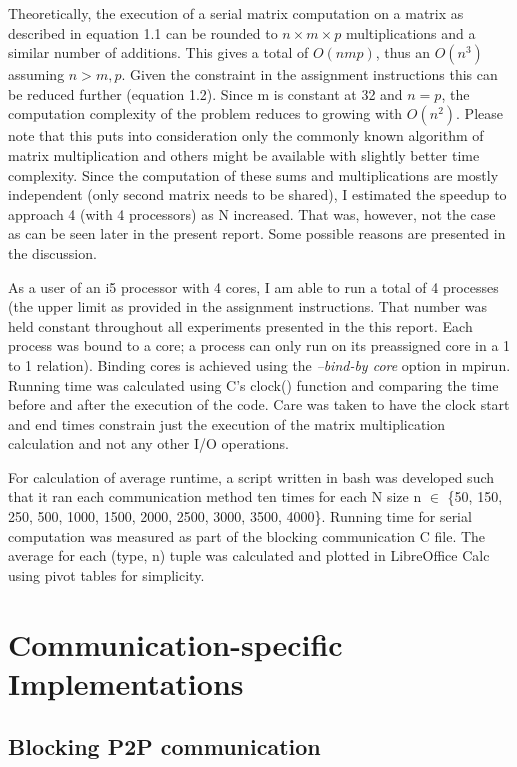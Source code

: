 \documentclass[12pt]{report}
\begin{document}
Theoretically, the execution of a serial matrix computation on a matrix as described in equation 1.1 can be rounded to $n \times m \times p$ multiplications and a similar number of additions. This gives a total of $O(nmp)$, thus an $O(n^3)$ assuming $n>m,p$. Given the constraint in the assignment instructions this can be reduced further (equation 1.2). Since m is constant at 32 and $n=p$, the computation complexity of the problem reduces to growing with $O(n^2)$. Please note that this puts into consideration only the commonly known algorithm of matrix multiplication and others might be available with slightly better time complexity. Since the computation of these sums and multiplications are mostly independent (only second matrix needs to be shared), I estimated the speedup to approach 4 (with 4 processors) as N increased. That was, however, not the case as can be seen later in the present report. Some possible reasons are presented in the discussion.

As a user of an i5 processor with 4 cores, I am able to run a total of 4 processes (the upper limit as provided in the assignment instructions. That number was held constant throughout all experiments presented in the this report. Each process was bound to a core; a process can only run on its preassigned core in a 1 to 1 relation). Binding cores is achieved using the \emph{--bind-by core} option in mpirun. Running time was calculated using C's clock() function and comparing the time before and after the execution of the code. Care was taken to have the clock start and end times constrain just the execution of the matrix multiplication calculation and not any other I/O operations.

For calculation of average runtime, a script written in bash was developed such that it ran each communication method ten times for each N size n $\in$ \{50, 150, 250, 500, 1000, 1500, 2000, 2500, 3000, 3500, 4000\}. Running time for serial computation was measured as part of the blocking communication C file. The average for each (type, n) tuple was calculated and plotted in LibreOffice Calc using pivot tables for simplicity. 


\chapter{Communication-specific Implementations}
\section{Blocking P2P communication}
\end{document}
